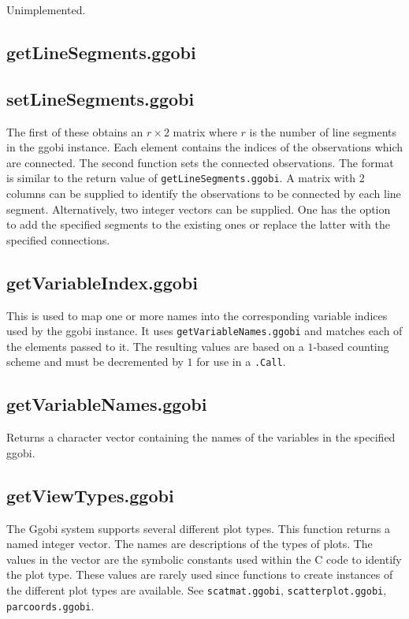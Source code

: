 \documentclass{article}
\def\SFunction#1{{\texttt{\red #1}}}
\begin{document}
Unimplemented.

\subsection{getLineSegments.ggobi}
\subsection{setLineSegments.ggobi}
The first of these obtains an $r \times 2$ matrix where $r$ is the
number of line segments in the ggobi instance.  Each element contains
the indices of the observations which are connected.  The second
function sets the connected observations.  The format is similar to
the return value of \SFunction{getLineSegments.ggobi}.  A matrix with
2 columns can be supplied to identify the observations to be connected
by each line segment.  Alternatively, two integer vectors can be
supplied.  One has the option to add the specified segments to the
existing ones or replace the latter with the specified connections.

\subsection{getVariableIndex.ggobi}
This is used to map one or more names into the corresponding variable
indices used by the ggobi instance.  It uses
\SFunction{getVariableNames.ggobi} and matches each of the elements
passed to it.
The resulting values are based on a $1$-based
counting scheme and must be decremented by $1$ for
use in a \SFunction{.Call}.

\subsection{getVariableNames.ggobi}
Returns  a character vector containing the names of the variables in
the specified ggobi.

\subsection{getViewTypes.ggobi}
The Ggobi system supports several different plot types. This function
returns a named integer vector. The names are descriptions of the
types of plots.  The values in the vector are the symbolic constants
used within the C code to identify the plot type.  These values are
rarely used since functions to create instances of the different plot
types are available.  See \SFunction{scatmat.ggobi},
\SFunction{scatterplot.ggobi}, \SFunction{parcoords.ggobi}.
\end{document}
